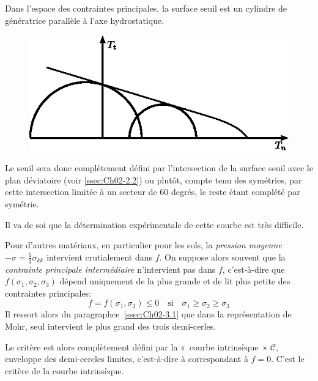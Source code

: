 Dans l'espace des contraintes principales, la surface seuil est un cylindre de génératrice parallèle à l'axe hydrostatique.

\begin{figure}
    \begin{center}
        \includegraphics{../images/T1_Ch05-03}
    \end{center}
\end{figure}

Le seuil sera donc complètement défini par l'intersection de la surface seuil avec le plan déviatoire (voir \ref{ssec:Ch02-2.2}) ou plutôt, compte tenu des symétries, par cette intersection limitée à un secteur de 60 degrés, le reste étant complété par symétrie.

Il va de soi que la détermination expérimentale de cette courbe est très difficile.

Pour d'autres matériaux, en particulier pour les sols, la \emph{pression moyenne} $-\sigma = \frac{1}{3}\sigma_{kk}$ intervient crutialement dans $f$.
On suppose alors souvent que la \emph{contrainte principale intermédiaire} n'intervient pas dans $f$, c'est-à-dire que $f\left( \sigma_1, \sigma_{2}, \sigma_3 \right)$ dépend uniquement de la plus grande et de lit plus petite des contraintes principales:
\begin{equation}
    f = f\left( \sigma_1, \sigma_3 \right) \leq 0 \quad \text{si} \quad \sigma_1 \geq \sigma_2 \geq \sigma_3
    \label{eq:Ch05-062}
\end{equation}
Il ressort alors du paragraphce~\ref{ssec:Ch02-3.1} que dans la représentation de Mohr, seul intervient le plus grand des trois demi-cerles.

Le critère est alors complètement défini par la «~courbe intrinsèque~» $\mathcal{C}$, enveloppe des demi-cercles limites, c'est-à-dire à  correspondant à $f=0$. 
C'est le critère de la courbe intrinsèque.

